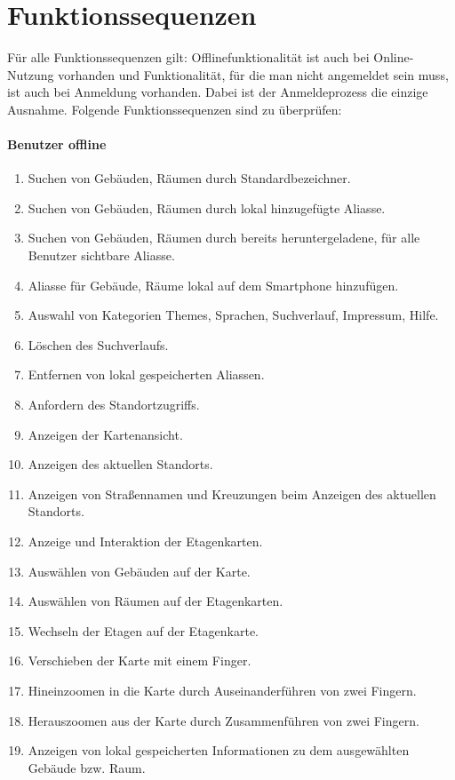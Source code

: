 \section{Funktionssequenzen}

Für alle Funktionssequenzen gilt:
Offlinefunktionalität ist auch bei Online-Nutzung vorhanden und Funktionalität, für die man nicht angemeldet sein muss, ist auch bei Anmeldung vorhanden. Dabei ist der Anmeldeprozess die einzige Ausnahme.
Folgende Funktionssequenzen sind zu überprüfen:

\paragraph{Benutzer offline}
\begin{enumerate}[label=\textbf{/T\arabic*0/}, align=left]
	\item Suchen von Gebäuden, Räumen durch Standardbezeichner.
	\item Suchen von Gebäuden, Räumen durch lokal hinzugefügte Aliasse.
	\item Suchen von Gebäuden, Räumen durch bereits heruntergeladene, für alle Benutzer sichtbare Aliasse.
	\item Aliasse für Gebäude, Räume lokal auf dem Smartphone hinzufügen.
	\item Auswahl von Kategorien Themes, Sprachen, Suchverlauf, Impressum, Hilfe.
	\item Löschen des Suchverlaufs.
	\item Entfernen von lokal gespeicherten Aliassen.
	\item Anfordern des Standortzugriffs.
	\item Anzeigen der Kartenansicht.
	\item Anzeigen des aktuellen Standorts.
	\item Anzeigen von Straßennamen und Kreuzungen beim Anzeigen des aktuellen Standorts.
	\item Anzeige und Interaktion der Etagenkarten.
	\item Auswählen von Gebäuden auf der Karte.
	\item Auswählen von Räumen auf der Etagenkarten.
	\item Wechseln der Etagen auf der Etagenkarte.
	\item Verschieben der Karte mit einem Finger.
	\item Hineinzoomen in die Karte durch Auseinanderführen von zwei Fingern.
	\item Herauszoomen aus der Karte durch Zusammenführen von zwei Fingern.
	\item Anzeigen von lokal gespeicherten Informationen zu dem ausgewählten Gebäude bzw. Raum.
\end{enumerate}

